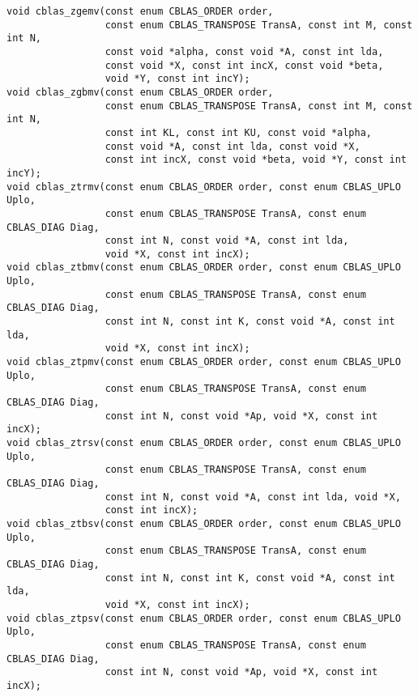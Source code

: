 \documentclass{article}
\begin{document}
\begin{Verbatim}[fontsize=\small,fontfamily=tt,fontshape=rm]
void cblas_zgemv(const enum CBLAS_ORDER order,
                 const enum CBLAS_TRANSPOSE TransA, const int M, const int N,
                 const void *alpha, const void *A, const int lda,
                 const void *X, const int incX, const void *beta,
                 void *Y, const int incY);
void cblas_zgbmv(const enum CBLAS_ORDER order,
                 const enum CBLAS_TRANSPOSE TransA, const int M, const int N,
                 const int KL, const int KU, const void *alpha,
                 const void *A, const int lda, const void *X,
                 const int incX, const void *beta, void *Y, const int incY);
void cblas_ztrmv(const enum CBLAS_ORDER order, const enum CBLAS_UPLO Uplo,
                 const enum CBLAS_TRANSPOSE TransA, const enum CBLAS_DIAG Diag,
                 const int N, const void *A, const int lda, 
                 void *X, const int incX);
void cblas_ztbmv(const enum CBLAS_ORDER order, const enum CBLAS_UPLO Uplo,
                 const enum CBLAS_TRANSPOSE TransA, const enum CBLAS_DIAG Diag,
                 const int N, const int K, const void *A, const int lda, 
                 void *X, const int incX);
void cblas_ztpmv(const enum CBLAS_ORDER order, const enum CBLAS_UPLO Uplo,
                 const enum CBLAS_TRANSPOSE TransA, const enum CBLAS_DIAG Diag,
                 const int N, const void *Ap, void *X, const int incX);
void cblas_ztrsv(const enum CBLAS_ORDER order, const enum CBLAS_UPLO Uplo,
                 const enum CBLAS_TRANSPOSE TransA, const enum CBLAS_DIAG Diag,
                 const int N, const void *A, const int lda, void *X,
                 const int incX);
void cblas_ztbsv(const enum CBLAS_ORDER order, const enum CBLAS_UPLO Uplo,
                 const enum CBLAS_TRANSPOSE TransA, const enum CBLAS_DIAG Diag,
                 const int N, const int K, const void *A, const int lda,
                 void *X, const int incX);
void cblas_ztpsv(const enum CBLAS_ORDER order, const enum CBLAS_UPLO Uplo,
                 const enum CBLAS_TRANSPOSE TransA, const enum CBLAS_DIAG Diag,
                 const int N, const void *Ap, void *X, const int incX);



\end{Verbatim}
\end{document}
